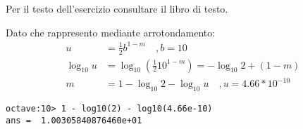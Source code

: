\begin{itemize}
\begin{exercise}[1.6]
Per il testo dell'esercizio consultare il libro di testo.
\end{exercise}
Dato che rappresento mediante arrotondamento:
\begin{displaymath}
\begin{split}
u &= \frac{1}{2}b^{1-m} \quad , b = 10 \\
\log_{10}{u} &= \log_{10}{\left ( \frac{1}{2}10^{1-m} \right )} = -\log_{10}{2} + (1 - m) \\
m &= 1 - \log_{10}{2} - \log_{10}{u} \quad , u = 4.66 * 10^{-10}
\end{split}
\end{displaymath}
\begin{lstlisting}
octave:10> 1 - log10(2) - log10(4.66e-10)
ans =  1.00305840876460e+01
\end{lstlisting}


\end{itemize}
